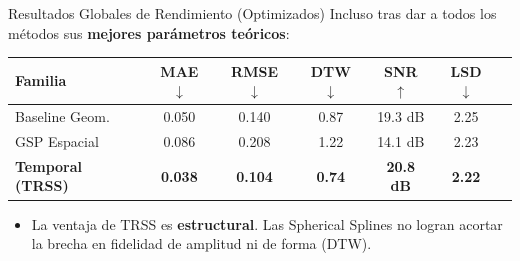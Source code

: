 \documentclass[10pt, aspectratio=169]{beamer}
\begin{document}
\begin{frame}{Resultados Globales de Rendimiento (Optimizados)}
    Incluso tras dar a todos los métodos sus \textbf{mejores parámetros teóricos}:
    
    \vspace{0.5cm}
    \centering
    \begin{tabular}{lcccccc}
    \toprule
    \textbf{Familia} & \textbf{MAE $\downarrow$} & \textbf{RMSE $\downarrow$} & \textbf{DTW $\downarrow$} & \textbf{SNR $\uparrow$} & \textbf{LSD $\downarrow$} \\
    \midrule
    Baseline Geom. & 0.050 & 0.140 & 0.87 & 19.3 dB & 2.25 \\
    GSP Espacial   & 0.086 & 0.208 & 1.22 & 14.1 dB & 2.23 \\
    \textbf{Temporal (TRSS)} & \textbf{0.038} & \textbf{0.104} & \textbf{0.74} & \textbf{20.8 dB} & \textbf{2.22} \\
    \bottomrule
    \end{tabular}
    
    \vspace{0.3cm}
    \begin{itemize}
        \item La ventaja de TRSS es \textbf{estructural}. Las Spherical Splines no logran acortar la brecha en fidelidad de amplitud ni de forma (DTW).
    \end{itemize}
\end{frame}
\end{document}
